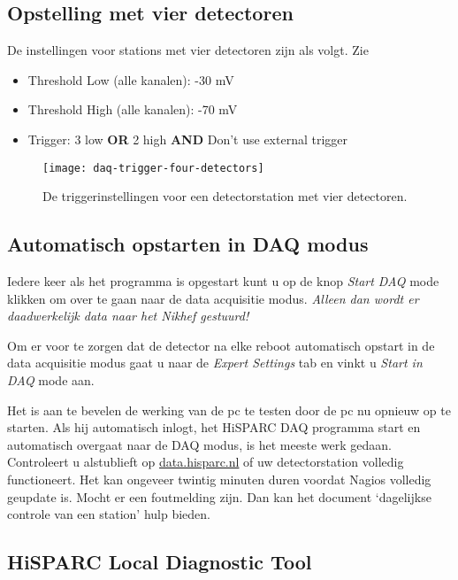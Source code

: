 \subsection{Opstelling met vier detectoren}

De instellingen voor stations met vier detectoren zijn als volgt. Zie

\begin{itemize}
    \item Threshold Low (alle kanalen): -30 mV
    \item Threshold High (alle kanalen): -70 mV
    \item Trigger: 3 low \textbf{OR} 2 high \textbf{AND} Don’t use external trigger
\end{itemize}   

 
\begin{figure}
    \centering
    \texttt{[image: daq-trigger-four-detectors]}
    \caption{De triggerinstellingen voor een detectorstation met vier detectoren.}
    \label{fig:daq-trigger-four-detectors}
\end{figure}

\subsection{Automatisch opstarten in DAQ modus}

Iedere keer als het programma is opgestart kunt u op de knop \emph{Start DAQ}
mode klikken om over te gaan naar de data acquisitie modus. \emph{Alleen dan
wordt er daadwerkelijk data naar het Nikhef gestuurd!}

Om er voor te zorgen dat de detector na elke reboot automatisch opstart
in de data acquisitie modus gaat u naar de \emph{Expert Settings} tab en vinkt
u \emph{Start in DAQ} mode aan.

\begin{note}
Het is aan te bevelen de werking van de pc te testen door de pc nu
opnieuw op te starten. Als hij automatisch inlogt, het HiSPARC DAQ
programma start en automatisch overgaat naar de DAQ modus, is het meeste
werk gedaan. Controleert u alstublieft op \url{data.hisparc.nl}
of uw detectorstation volledig functioneert. Het kan ongeveer twintig
minuten duren voordat Nagios volledig geupdate is. Mocht er een foutmelding 
zijn. Dan kan het document `dagelijkse controle van een station' hulp bieden.
\end{note}


\subsection{HiSPARC Local Diagnostic Tool}

